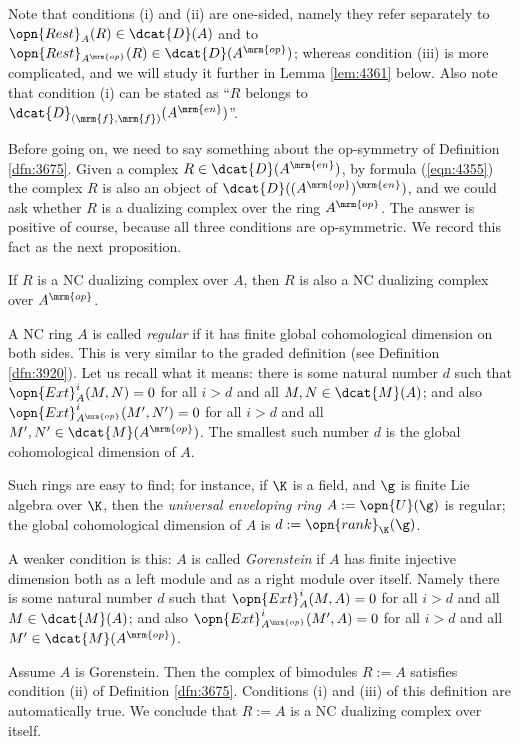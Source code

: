 Note that conditions (i) and (ii) are one-sided, namely they refer separately 
to $\opn{Rest}_{A}(R) \in \dcat{D}(A)$ and 
to  $\opn{Rest}_{A^{\mrm{op}}}(R) \in \dcat{D}(A^{\mrm{op}})$; 
whereas condition (iii) is more complicated, and we will study it further in 
Lemma \ref{lem:4361} below. Also note that condition (i) can be stated as ``$R$ 
belongs to $\dcat{D}_{(\mrm{f}, \mrm{f})}(A^{\mrm{en}})$''. 

Before going on, we need to say something about the op-symmetry of  
Definition \ref{dfn:3675}. Given a complex 
$R \in \dcat{D}(A^{\mrm{en}})$, by formula (\ref{eqn:4355}) the complex $R$ is 
also an object of $\dcat{D}((A^{\mrm{op}})^{\mrm{en}})$, and we could ask 
whether $R$ is a dualizing complex over the ring $A^{\mrm{op}}$. The answer is 
positive of course, because all three conditions are op-symmetric. We record 
this fact as the next proposition. 

\begin{prop} \label{prop:4355}
If $R$ is a NC dualizing complex over $A$, then $R$ is also a 
NC dualizing complex over $A^{\mrm{op}}$. 
\end{prop}

\begin{exa} \label{exa:3695} 
A NC ring $A$ is called {\em regular} if it has finite global cohomological 
dimension on both sides. 
This is very similar to the graded definition (see Definition \ref{dfn:3920}).
Let us recall what it means: there is some 
natural number $d$ such that $\opn{Ext}^i_A(M, N) = 0$ for all $i > d$ and 
all $M, N \in \dcat{M}(A)$; and also  
$\opn{Ext}^i_{A^{\mrm{op}}}(M', N') = 0$ for all $i > d$ and 
all $M', N' \in \dcat{M}(A^{\mrm{op}})$. 
The smallest such number $d$ is the global cohomological dimension of $A$. 

Such rings are easy to find; for instance, if $\K$ is a field, and $\g$ is 
finite Lie algebra over $\K$, then the {\em universal enveloping ring}
$A := \opn{U}(\g)$ is regular; the global cohomological dimension of $A$ is 
$d := \opn{rank}_{\K}(\g)$.  

A weaker condition is this: $A$ is called {\em Gorenstein} if $A$ has finite 
injective dimension both as a left module and as a right module over itself. 
Namely there is some natural number $d$ such that 
$\opn{Ext}^i_A(M, A) = 0$ for all $i > d$ and all $M \in \dcat{M}(A)$; and 
also $\opn{Ext}^i_{A^{\mrm{op}}}(M', A) = 0$ for all $i > d$ and 
all $M' \in \dcat{M}(A^{\mrm{op}})$. 

Assume $A$ is Gorenstein. Then the complex of bimodules 
$R := A$ satisfies condition (ii) of Definition \ref{dfn:3675}. 
Conditions (i) and (iii) of this definition are automatically true. We conclude 
that $R := A$ is a NC dualizing complex over itself. 
\end{exa}

